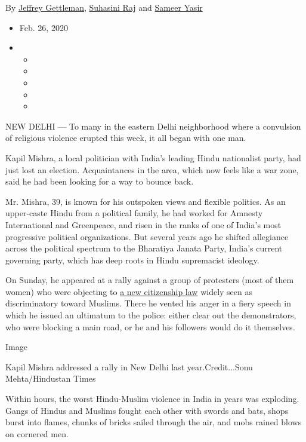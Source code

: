 By \href{https://www.nytimes.com/by/jeffrey-gettleman}{Jeffrey
Gettleman}, \href{https://www.nytimes.com/by/suhasini-raj}{Suhasini Raj}
and \href{https://www.nytimes.com/by/sameer-yasir}{Sameer Yasir}

\begin{itemize}
\item
  Feb. 26, 2020
\item
  \begin{itemize}
  \item
  \item
  \item
  \item
  \item
  \end{itemize}
\end{itemize}

NEW DELHI --- To many in the eastern Delhi neighborhood where a
convulsion of religious violence erupted this week, it all began with
one man.

Kapil Mishra, a local politician with India's leading Hindu nationalist
party, had just lost an election. Acquaintances in the area, which now
feels like a war zone, said he had been looking for a way to bounce
back.

Mr. Mishra, 39, is known for his outspoken views and flexible politics.
As an upper-caste Hindu from a political family, he had worked for
Amnesty International and Greenpeace, and risen in the ranks of one of
India's most progressive political organizations. But several years ago
he shifted allegiance across the political spectrum to the Bharatiya
Janata Party, India's current governing party, which has deep roots in
Hindu supremacist ideology.

On Sunday, he appeared at a rally against a group of protesters (most of
them women) who were objecting to
\href{https://www.nytimes.com/2019/12/16/world/asia/india-citizenship-protests.html}{a
new citizenship law} widely seen as discriminatory toward Muslims. There
he vented his anger in a fiery speech in which he issued an ultimatum to
the police: either clear out the demonstrators, who were blocking a main
road, or he and his followers would do it themselves.

Image

Kapil Mishra addressed a rally in New Delhi last year.Credit...Sonu
Mehta/Hindustan Times

Within hours, the worst Hindu-Muslim violence in India in years was
exploding. Gangs of Hindus and Muslims fought each other with swords and
bats, shops burst into flames, chunks of bricks sailed through the air,
and mobs rained blows on cornered men.

